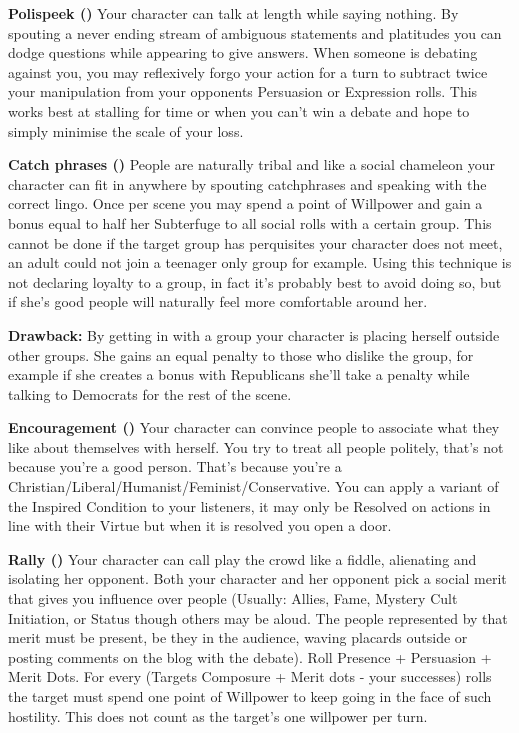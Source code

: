 \textbf{Polispeek (\textbullet\textbullet)} Your character can talk at length while saying nothing. By spouting a never ending stream of ambiguous statements and platitudes you can dodge questions while appearing to give answers. When someone is debating against you, you may reflexively forgo your action for a turn to subtract twice your manipulation from your opponents Persuasion or Expression rolls. This works best at stalling for time or when you can't win a debate and hope to simply minimise the scale of your loss.

\textbf{Catch phrases (\textbullet\textbullet\textbullet)} People are naturally tribal and like a social chameleon your character can fit in anywhere by spouting catchphrases and speaking with the correct lingo. Once per scene you may spend a point of Willpower and gain a bonus equal to half her Subterfuge to all social rolls with a certain group. This cannot be done if the target group has perquisites your character does not meet, an adult could not join a teenager only group for example. Using this technique is not declaring loyalty to a group, in fact it's probably best to avoid doing so, but if she's good people will naturally feel more comfortable around her.

\textbf{Drawback:} By getting in with a group your character is placing herself outside other groups. She gains an equal penalty to those who dislike the group, for example if she creates a bonus with Republicans she'll take a penalty while talking to Democrats for the rest of the scene. 

\textbf{Encouragement (\textbullet\textbullet\textbullet\textbullet)} Your character can convince people to associate what they like about themselves with herself. You try to treat all people politely, that's not because you're a good person. That's because you're a Christian/Liberal/Humanist/Feminist/Conservative. You can apply a variant of the Inspired Condition to your listeners, it may only be Resolved on actions in line with their Virtue but when it is resolved you open a door.

\textbf{Rally (\textbullet\textbullet\textbullet\textbullet\textbullet)} Your character can call play the crowd like a fiddle, alienating and isolating her opponent. Both your character and her opponent pick a social merit that gives you influence over people (Usually: Allies, Fame, Mystery Cult Initiation, or Status though others may be aloud. The people represented by that merit must be present, be they in the audience, waving placards outside or posting comments on the blog with the debate). Roll Presence + Persuasion + Merit Dots. For every (Targets Composure + Merit dots - your successes) rolls the target must spend one point of Willpower to keep going in the face of such hostility. This does not count as the target's one willpower per turn.

